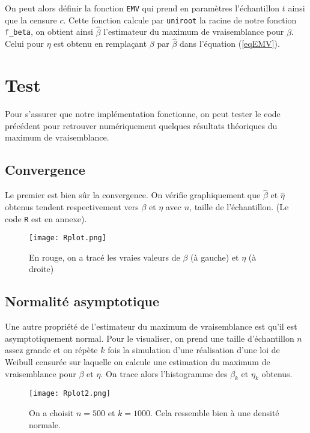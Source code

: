 \documentclass[a4paper]{report}
\begin{document}
 On peut alors définir la fonction \verb|EMV| qui prend en paramètres l'échantillon $t$ ainsi que la censure $c$. Cette fonction calcule par \verb|uniroot| la racine de notre fonction \verb|f_beta|, on obtient ainsi $\hat{\beta}$ l'estimateur du maximum de vraisemblance pour $\beta$. Celui pour $\eta$ est obtenu en remplaçant $\beta$ par $\hat{\beta}$ dans l'équation (\ref{eqEMV}). 


     
\section{Test}

Pour s'assurer que notre implémentation fonctionne, on peut tester le code précédent pour retrouver numériquement quelques résultats théoriques du maximum de vraisemblance.     
    
\subsection{Convergence}

Le premier est bien sûr la convergence. On vérifie graphiquement que $\hat{\beta}$ et $\hat{\eta}$ obtenus tendent respectivement vers $\beta$ et $\eta$ avec $n$, taille de l'échantillon. (Le code \verb|R| est en annexe).

 \begin{figure}[!ht]
	\centering
     	\texttt{[image: Rplot.png]}

	\caption{En rouge, on a tracé les vraies valeurs de $\beta$ (à gauche) et $\eta$ (à droite)}
\end{figure}

\subsection{Normalité asymptotique}

Une autre propriété de l'estimateur du maximum de vraisemblance est qu'il est asymptotiquement normal. Pour le visualiser, on prend une taille d'échantillon $n$ assez grande et on répète $k$ fois la simulation d'une réalisation d'une loi de Weibull censurée sur laquelle on calcule une estimation du maximum de vraisemblance pour $\beta$ et $\eta$. On trace alors l'histogramme des $\beta_k$ et $\eta_k$ obtenus. 

\begin{figure}[!ht]
	\centering
     	\texttt{[image: Rplot2.png]}

	\caption{On a choisit $n=500$ et $k=1000$. Cela ressemble bien à une densité normale.}
\end{figure}
\end{document}

